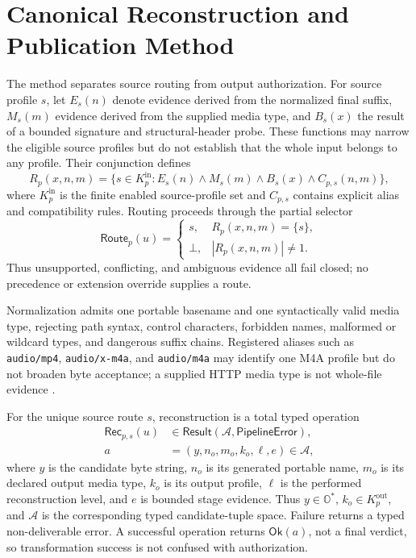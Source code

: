 \section{Canonical Reconstruction and Publication Method}
\label{sec:formal-method}

The method separates source routing from output authorization. For source
profile \(s\), let \(E_s(n)\) denote evidence derived from the normalized final
suffix, \(M_s(m)\) evidence derived from the supplied media type, and \(B_s(x)\)
the result of a bounded signature and structural-header probe. These functions
may narrow the eligible source profiles but do not establish that the whole
input belongs to any profile. Their conjunction defines
\begin{equation}
  R_p(x,n,m)=
  \{s\in K^{\mathrm{in}}_p:
    E_s(n)\land M_s(m)\land B_s(x)\land C_{p,s}(n,m)\},
  \label{eq:eligible-routes}
\end{equation}
where \(K^{\mathrm{in}}_p\) is the finite enabled source-profile set and
\(C_{p,s}\) contains explicit alias and compatibility rules. Routing proceeds
through the partial selector
\begin{equation}
 \mathsf{Route}_p(u)=
 \begin{cases}
   s, & R_p(x,n,m)=\{s\},\\
   \bot, & |R_p(x,n,m)|\neq 1.
 \end{cases}
 \label{eq:unique-route}
\end{equation}
Thus unsupported, conflicting, and ambiguous evidence all fail closed; no
precedence or extension override supplies a route.

Normalization admits one portable basename and one syntactically valid media
type, rejecting path syntax, control characters, forbidden names, malformed or
wildcard types, and dangerous suffix chains. Registered aliases such as
\texttt{audio/mp4}, \texttt{audio/x-m4a}, and \texttt{audio/m4a} may identify
one M4A profile but do not broaden byte acceptance; a supplied HTTP media type
is not whole-file evidence \cite{rfc9110}.

For the unique source route \(s\), reconstruction is a total typed operation
\begin{equation}
\begin{aligned}
  \mathsf{Rec}_{p,s}(u)&\in
  \mathsf{Result}(\mathcal A,\mathsf{PipelineError}),\\
  a&=(y,n_o,m_o,k_o,\ell,e)\in\mathcal A,
\end{aligned}
  \label{eq:reconstruction-relation}
\end{equation}
where \(y\) is the candidate byte string, \(n_o\) is its generated portable
name, \(m_o\) is its declared output media type, \(k_o\) is its output profile,
\(\ell\) is the performed reconstruction level, and \(e\) is bounded stage
evidence. Thus \(y\in\mathbb O^*\), \(k_o\in K_p^{\mathrm{out}}\), and
\(\mathcal A\) is the corresponding typed candidate-tuple space. Failure
returns a typed non-deliverable error. A successful operation
returns \(\mathsf{Ok}(a)\), not a final verdict, so transformation success is
not confused with authorization.

